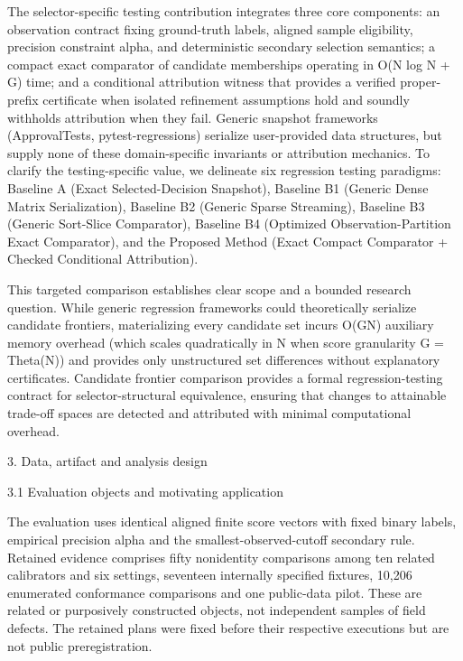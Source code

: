 \documentclass[11pt,a4paper]{article}
\begin{document}
The selector-specific testing contribution integrates three core components: an observation contract fixing ground-truth labels, aligned sample eligibility, precision constraint alpha, and deterministic secondary selection semantics; a compact exact comparator of candidate memberships operating in O(N log N + G) time; and a conditional attribution witness that provides a verified proper-prefix certificate when isolated refinement assumptions hold and soundly withholds attribution when they fail. Generic snapshot frameworks (ApprovalTests, pytest-regressions) serialize user-provided data structures, but supply none of these domain-specific invariants or attribution mechanics. To clarify the testing-specific value, we delineate six regression testing paradigms: Baseline A (Exact Selected-Decision Snapshot), Baseline B1 (Generic Dense Matrix Serialization), Baseline B2 (Generic Sparse Streaming), Baseline B3 (Generic Sort-Slice Comparator), Baseline B4 (Optimized Observation-Partition Exact Comparator), and the Proposed Method (Exact Compact Comparator + Checked Conditional Attribution).

This targeted comparison establishes clear scope and a bounded research question. While generic regression frameworks could theoretically serialize candidate frontiers, materializing every candidate set incurs O(GN) auxiliary memory overhead (which scales quadratically in N when score granularity G = Theta(N)) and provides only unstructured set differences without explanatory certificates. Candidate frontier comparison provides a formal regression-testing contract for selector-structural equivalence, ensuring that changes to attainable trade-off spaces are detected and attributed with minimal computational overhead.

3. Data, artifact and analysis design

3.1 Evaluation objects and motivating application

The evaluation uses identical aligned finite score vectors with fixed binary labels, empirical precision alpha and the smallest-observed-cutoff secondary rule. Retained evidence comprises fifty nonidentity comparisons among ten related calibrators and six settings, seventeen internally specified fixtures, 10,206 enumerated conformance comparisons and one public-data pilot. These are related or purposively constructed objects, not independent samples of field defects. The retained plans were fixed before their respective executions but are not public preregistration.
\end{document}
